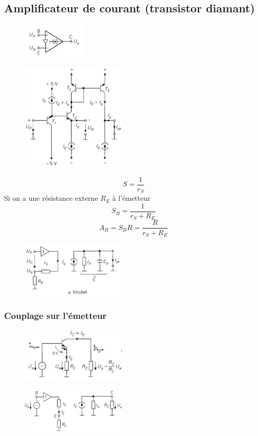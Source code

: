 \documentclass[resume]{subfiles}
\begin{document}
\begin{multicols}{3}
\subsection{Amplificateur de courant (transistor diamant)}
\begin{figure}[H]
\centering
\includegraphics[width=3.00cm]{img_60.png}
\end{figure}
\begin{figure}[H]
\centering
\includegraphics[width=5.00cm]{img_59.png}
\end{figure}
$$S=\frac{1}{r_S}$$
Si on a une résistance externe $R_E$ à l'émetteur 
$$S_B=\frac{1}{r_S+R_E}$$
$$A_B=S_BR=\frac{R}{r_S+R_E}$$
\begin{figure}[H]
\centering
\includegraphics[width=5.00cm]{img_61.png}
\end{figure}
\subsubsection{Couplage sur l'émetteur}
\begin{figure}[H]
\centering
\includegraphics[width=5.00cm]{img_62.png}
\end{figure}
\begin{figure}[H]
\centering
\includegraphics[width=5.00cm]{img_63.png}
\end{figure}

\end{multicols}
\end{document}
